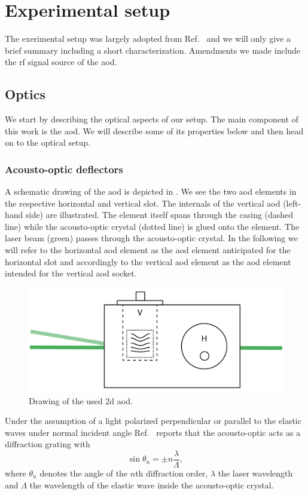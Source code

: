 \chapter{Experimental setup}\label{ch:experimental_setup}

The exerimental setup was largely adopted from Ref.~\cite{Hertlein2017} and we
will only give a brief summary including a short characterization. Amendments
we made include the \gls{rf} signal source of the \gls{aod}.

\section{Optics}

We start by describing the optical aspects of our setup. The main component
of this work is the \gls{aod}. We will describe some of its properties below
and then head on to the optical setup.

\subsection{Acousto-optic deflectors}

A schematic drawing of the \gls{aod} is depicted in . We
see the two \gls{aod} elements in the respective horizontal and vertical slot.
The internals of the vertical \gls{aod} (left-hand side) are illustrated. The
element itself spans through the casing (dashed line) while the acousto-optic
crystal (dotted line) is glued onto the element. The laser beam (green) passes
through the acousto-optic crystal. In the following we will refer to the
horizontal \gls{aod} element as the \gls{aod} element anticipated for the
horizontal slot and accordingly to the vertical \gls{aod} element as the
\gls{aod} element intended for the vertical \gls{aod} socket.
\begin{figure}[h]
  \centering
  \includegraphics[width=.6\textwidth]{../media/setup/aod-socket.png}
  \caption{Drawing of the used \gls{2d} \gls{aod}.
  }\label{fig:aod_socket}
\end{figure}
Under the assumption of a light polarized perpendicular or parallel to the
elastic waves under normal incident angle Ref.~\cite{Royer1999} reports that
the acousto-optic acts as a diffraction grating with
\begin{equation}
  \sin\theta_n=\pm n\frac{\lambda}{\Lambda}
  \label{eq:angle_gratting},
\end{equation}
where $\theta_n$ denotes the angle of the $n$th diffraction order, $\lambda$
the laser wavelength and $\Lambda$ the wavelength of the elastic wave inside
the acousto-optic crystal.

